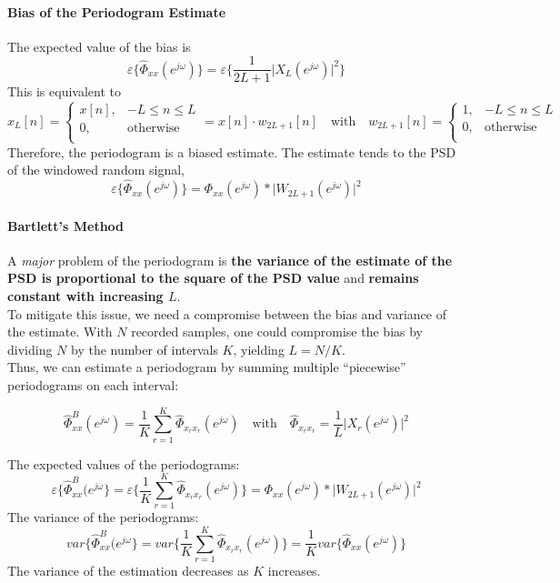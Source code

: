 \paragraph{Bias of the Periodogram Estimate}
The expected value of the bias is
\[
    \varepsilon\{\widehat{\Phi}_{xx}(e^{j\omega})\} = \varepsilon \bigg\{ \frac{1}{2L+1} \lvert X_{L}(e^{j\omega})\rvert^2 \bigg\}
\]
This is equivalent to
\[
    x_{L}[n] = 
    \begin{cases}
        x[n], & -L \leq n \leq L \\
        0, & \text{otherwise} \\
    \end{cases}
    = x[n] \cdot w_{2L+1}[n]
    \quad \text{with} \quad 
    w_{2L+1}[n] = 
    \begin{cases}
        1, & -L\leq n\leq L \\
        0, & \text{otherwise} \\
    \end{cases}
\]
Therefore, the periodogram is a biased estimate. The estimate tends to the PSD of the windowed random signal,
\[
    \varepsilon \{ \widehat{\Phi}_{xx}(e^{j\omega}) \} = \Phi_{xx}(e^{j\omega}) * \lvert W_{2L+1}(e^{j\omega}) \rvert^2
\]

\paragraph{Bartlett's Method}
A \textit{major} problem of the periodogram is \textbf{the variance of the estimate of the PSD is proportional to the square of the PSD value} and \textbf{remains constant with increasing $L$}. \\

To mitigate this issue, we need a compromise between the bias and variance of the estimate. With $N$ recorded samples, one could compromise the bias by dividing $N$ by the number of intervals $K$, yielding $L = N/K$. \\

Thus, we can estimate a periodogram by summing multiple ``piecewise'' periodograms on each interval:

\[
    \widehat{\Phi}_{xx}^B (e^{j\omega}) = \frac{1}{K} \sum_{r=1}^{K} \hat{\Phi}_{x_{r}x_{r}} (e^{j\omega}) \quad \text{with} \quad \hat{\Phi}_{x_{r}x_{r}} = \frac{1}{L} \lvert X_{r} (e^{j\omega}) \rvert^2
\]

The expected values of the periodograms:
\[
    \varepsilon\{\widehat{\Phi}_{xx}^{B} (e^{j\omega}\}
    = \varepsilon\bigg\{ \frac{1}{K} \sum_{r=1}^{K} \widehat{\Phi}_{x_{r}x_{r}} (e^{j\omega}) \bigg\} = \Phi_{xx}(e^{j\omega}) * \lvert W_{2L+1}(e^{j\omega}) \rvert^2
\]
The variance of the periodograms:
\[
    var\{\widehat{\Phi}_{xx}^{B} (e^{j\omega}\} = var \bigg\{ \frac{1}{K} \sum_{r=1}^{K} \widehat{\Phi}_{x_{r}x_{r}} (e^{j\omega}) \bigg\} = \frac{1}{K} var\{\widehat{\Phi}_{xx}(e^{j\omega}) \}
\]
The variance of the estimation decreases as $K$ increases. 

